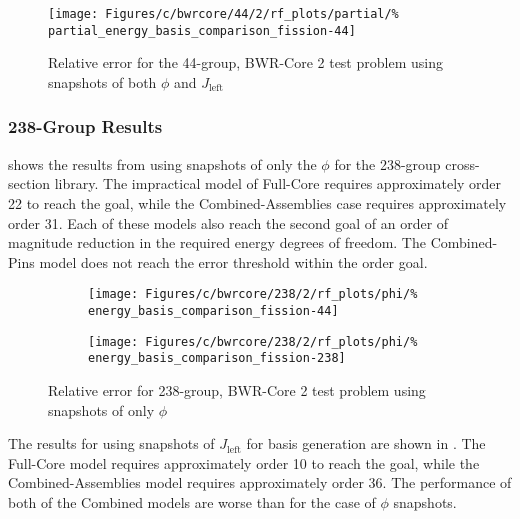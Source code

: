\begin{figure*}[tb]
    \centering
    \texttt{[image: Figures/c/bwrcore/44/2/rf\_plots/partial/\%
        partial\_energy\_basis\_comparison\_fission-44]}
    \caption{Relative error for the 44-group, BWR-Core 2 test problem using 
        snapshots of both $\phi$ and $J_{\text{left}}$}
    \label{fig:BWR2_combined}
\end{figure*}

\subsubsection{238-Group Results}

 shows the results from using snapshots of only the 
$\phi$ for the 238-group cross-section library.  The impractical model of 
Full-Core requires approximately order 22 to reach the goal, while the 
Combined-Assemblies case requires approximately order 31.  Each of these models 
also 
reach the second goal of an order of magnitude reduction in the required energy 
degrees of freedom.  The Combined-Pins model does not reach the error threshold 
within the order goal.  

\begin{figure*}[tb]
    \centering
    \begin{subfigure}{0.5\textwidth}
        \centering
    \texttt{[image: Figures/c/bwrcore/238/2/rf\_plots/phi/\%
        energy\_basis\_comparison\_fission-44]}
    \end{subfigure}%
    \begin{subfigure}{0.5\textwidth}
        \centering
    \texttt{[image: Figures/c/bwrcore/238/2/rf\_plots/phi/\%
        energy\_basis\_comparison\_fission-238]}
    \end{subfigure}
    \caption{Relative error for 238-group, BWR-Core 2 test problem using 
        snapshots of only $\phi$}
    \label{fig:BWR2_phi-238}
\end{figure*}

The results for using snapshots of $J_{\text{left}}$ for basis 
generation are shown in .  The Full-Core model 
requires approximately order 10 to reach the goal, while the 
Combined-Assemblies 
model requires approximately order 36.  The performance of both of 
the Combined models are worse than for the case of $\phi$ snapshots.


